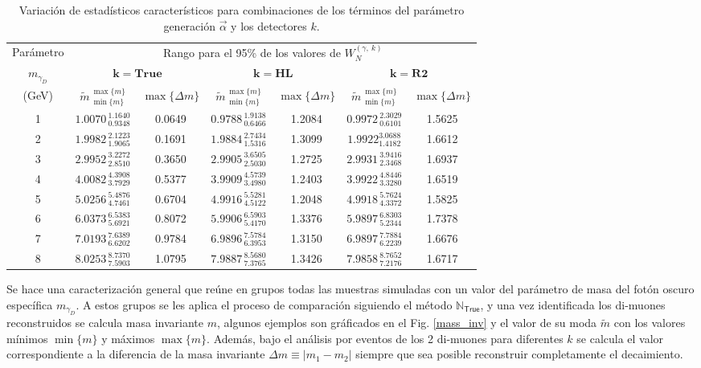 \begin{table}[!t]
\centering
\footnotesize%
\begin{tabular}{|c|cccccc|}
\toprule
Parámetro& \multicolumn{6}{c|}{Rango para el 95\% de los valores de $W_N^{(\gamma, ~ k)}$ }\\
$m_{\gamma_D}$ & \multicolumn{2}{c}{$\mathbf{k = True}$} & \multicolumn{2}{c}{$\mathbf{k = HL}$} & \multicolumn{2}{c|}{$\mathbf{k = R2}$}\\
(GeV)
& $\widetilde{m}^{~\max{\{m\}}}_{~\min{\{m\}}}$ & $\max{\{\Delta m\}}$
& $\widetilde{m}^{~\max{\{m\}}}_{~\min{\{m\}}}$ & $\max{\{\Delta m\}}$ 
& $\widetilde{m}^{~\max{\{m\}}}_{~\min{\{m\}}}$ & $\max{\{\Delta m\}}$ \\
\midrule
1 & $1.0070^{~1.1640}_{~0.9348}$ & 0.0649 & $0.9788^{~1.9138}_{~0.6466}$ & 1.2084 & $0.9972^{~2.3029}_{~0.6101}$ & 1.5625 \\ \midrule
2 & $1.9982^{~2.1223}_{~1.9065}$ & 0.1691 & $1.9884^{~2.7434}_{~1.5316}$ & 1.3099 & $1.9922^{3.0688}_{1.4182}$ & 1.6612\\ \midrule
3 & $2.9952^{~3.2272}_{~2.8510}$ & 0.3650 & $2.9905^{~3.6505}_{~2.5030}$ & 1.2725 & $2.9931^{~3.9416}_{~2.3468}$ & 1.6937\\ \midrule
4 & $4.0082^{~4.3908}_{~3.7929}$ & 0.5377 & $3.9909^{~4.5739}_{~3.4980}$ & 1.2403 & $3.9922^{~4.8446}_{~3.3280}$ & 1.6519\\ \midrule
5 & $5.0256^{~5.4876}_{~4.7461}$ & 0.6704 & $4.9916^{~5.5281}_{~4.5122}$ & 1.2048 & $4.9918^{~5.7624}_{~4.3372}$ & 1.5825 \\ \midrule
6 & $6.0373^{~6.5383}_{~5.6921}$ & 0.8072 & $5.9906^{~6.5903}_{~5.4170}$ & 1.3376 & $5.9897^{~6.8303}_{~5.2344}$ & 1.7378\\ \midrule
7 & $7.0193^{~7.6389}_{~6.6202}$ & 0.9784 & $6.9896^{~7.5784}_{~6.3953}$ & 1.3150 & $6.9897^{~7.7884}_{~6.2239}$ & 1.6676\\ \midrule
8 & $8.0253^{~8.7370}_{~7.5903}$ & 1.0795 & $7.9887^{~8.5680}_{~7.3765}$ & 1.3426 & $7.9858^{~8.7652}_{~7.2176}$ & 1.6717\\
\bottomrule 
\end{tabular}
\caption{Variación de estadísticos característicos para combinaciones de los términos del parámetro generación $\vec{\alpha}$ y los detectores $k$.}
\label{mass0}
\end{table}

Se hace una caracterización general que reúne en grupos todas las muestras simuladas con un valor del parámetro de masa del fotón oscuro específica $m_{\gamma_D}$. A estos grupos se les aplica el proceso de comparación siguiendo el método $\mathbb{N}_\textsf{True}$, y una vez identificada los di-muones reconstruidos se calcula masa invariante $m$, algunos ejemplos son gráficados en el Fig. \ref{mass_inv} y el valor de su moda $\widetilde{m}$ con los valores mínimos $\min{\{m\}}$ y máximos $\max{\{m\}}$. Además, bajo el análisis por eventos de los 2 di-muones para diferentes $k$ se calcula el valor correspondiente a la diferencia de la masa invariante $\Delta m\equiv|m_1-m_2|$ siempre que sea posible reconstruir completamente el decaimiento.

